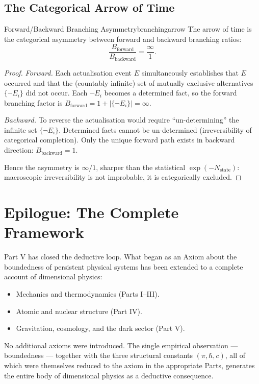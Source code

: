 \subsection{The Categorical Arrow of Time}

\begin{consequence}{Forward/Backward Branching Asymmetry}{branchingarrow}
  The arrow of time is the categorical asymmetry between forward and backward
  branching ratios:
  \begin{equation}
    \frac{B_{\mathrm{forward}}}{B_{\mathrm{backward}}} = \frac{\infty}{1}.
  \end{equation}
\end{consequence}

\begin{proof}
\emph{Forward.} Each actualisation event $E$ simultaneously establishes that
$E$ occurred and that the (countably infinite) set of mutually exclusive
alternatives $\{\neg E_{i}\}$ did not occur.
Each $\neg E_{i}$ becomes a determined fact, so the forward branching factor is
$B_{\mathrm{forward}} = 1 + |\{\neg E_{i}\}| = \infty$.

\emph{Backward.} To reverse the actualisation would require
``un-determining'' the infinite set $\{\neg E_{i}\}$.
Determined facts cannot be un-determined (irreversibility of categorical
completion).
Only the unique forward path exists in backward direction:
$B_{\mathrm{backward}} = 1$.

Hence the asymmetry is $\infty/1$, sharper than the statistical
$\exp(-N_{\mathrm{state}})$: macroscopic irreversibility is not improbable, it
is categorically excluded.
\end{proof}

\section{Epilogue: The Complete Framework}
\label{sec:ch20-epilogue}

Part V has closed the deductive loop.
What began as an Axiom about the boundedness of persistent physical systems has
been extended to a complete account of dimensional physics:
\begin{itemize}[nosep]
\item Mechanics and thermodynamics (Parts I--III).
\item Atomic and nuclear structure (Part IV).
\item Gravitation, cosmology, and the dark sector (Part V).
\end{itemize}
No additional axioms were introduced.
The single empirical observation --- boundedness --- together with the three
structural constants $(\pi, \hbar, c)$, all of which were themselves reduced to
the axiom in the appropriate Parts, generates the entire body of dimensional
physics as a deductive consequence.

